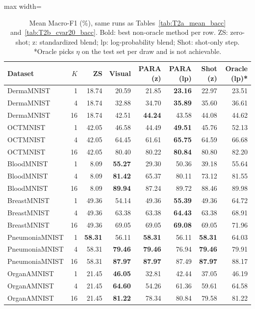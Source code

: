 \begin{table}[t]
\centering
\small
\caption{Mean Macro-F1 (\%), same runs as Tables~\ref{tab:T2a_mean_bacc} and~\ref{tab:T2b_cvar20_bacc}. Bold: best non-oracle method per row. ZS: zero-shot; z: standardized blend; lp: log-probability blend; Shot: shot-only step. *Oracle picks $\eta$ on the test set per draw and is not achievable.}
\label{tab:T2c_macro_f1}
\begin{adjustbox}{max width=\linewidth}
\begin{tabular}{lrrrrrrr}
\toprule
Dataset & $K$ & ZS & Visual & PARA (z) & PARA (lp) & Shot (z) & Oracle (lp)* \\
\midrule
DermaMNIST & 1 & 18.74 & 20.59 & 21.85 & \textbf{23.16} & 22.97 & 23.51 \\
DermaMNIST & 4 & 18.74 & 32.88 & 34.70 & \textbf{35.89} & 35.60 & 36.61 \\
DermaMNIST & 16 & 18.74 & 42.51 & \textbf{44.24} & 43.58 & 44.08 & 44.62 \\
OCTMNIST & 1 & 42.05 & 46.58 & 44.49 & \textbf{49.51} & 45.76 & 52.13 \\
OCTMNIST & 4 & 42.05 & 64.45 & 61.61 & \textbf{65.75} & 64.59 & 66.68 \\
OCTMNIST & 16 & 42.05 & 80.40 & 80.22 & \textbf{80.84} & 80.80 & 82.20 \\
BloodMNIST & 1 & 8.09 & \textbf{55.27} & 29.30 & 50.36 & 39.18 & 55.64 \\
BloodMNIST & 4 & 8.09 & \textbf{81.42} & 65.37 & 80.11 & 73.12 & 81.55 \\
BloodMNIST & 16 & 8.09 & \textbf{89.94} & 87.24 & 89.72 & 88.46 & 89.98 \\
BreastMNIST & 1 & 49.36 & 54.14 & 49.36 & \textbf{55.39} & 49.36 & 64.72 \\
BreastMNIST & 4 & 49.36 & 63.38 & 63.38 & \textbf{64.43} & 63.38 & 68.91 \\
BreastMNIST & 16 & 49.36 & 69.05 & 69.05 & \textbf{69.08} & 69.05 & 71.96 \\
PneumoniaMNIST & 1 & \textbf{58.31} & 56.11 & \textbf{58.31} & 56.11 & \textbf{58.31} & 64.03 \\
PneumoniaMNIST & 4 & 58.31 & \textbf{79.46} & \textbf{79.46} & 76.94 & \textbf{79.46} & 79.91 \\
PneumoniaMNIST & 16 & 58.31 & \textbf{87.97} & \textbf{87.97} & 87.49 & \textbf{87.97} & 88.17 \\
OrganAMNIST & 1 & 21.45 & \textbf{46.05} & 32.81 & 42.44 & 37.05 & 46.19 \\
OrganAMNIST & 4 & 21.45 & \textbf{64.60} & 54.26 & 61.36 & 59.61 & 64.58 \\
OrganAMNIST & 16 & 21.45 & \textbf{81.22} & 78.34 & 80.84 & 79.58 & 81.22 \\
\bottomrule
\end{tabular}
\end{adjustbox}
\end{table}
